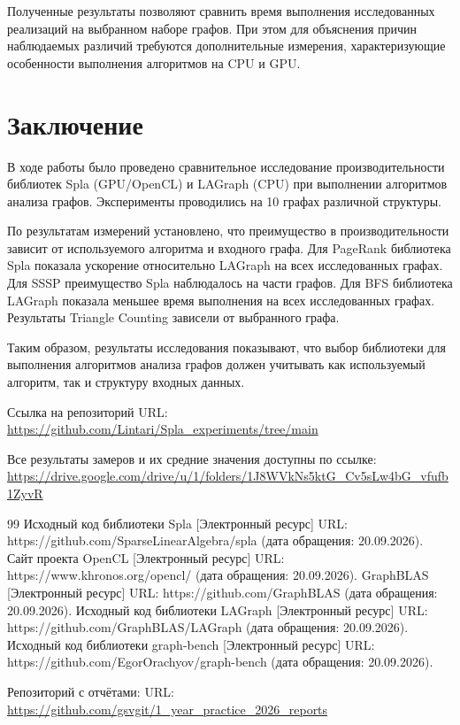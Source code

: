 \documentclass[a4paper]{article}
\begin{document}
Полученные результаты позволяют сравнить время выполнения
исследованных реализаций на выбранном наборе графов.
При этом для объяснения причин наблюдаемых различий
требуются дополнительные измерения, характеризующие
особенности выполнения алгоритмов на CPU и GPU.
\section{Заключение}
В ходе работы было проведено сравнительное исследование
производительности библиотек Spla (GPU/OpenCL) и LAGraph (CPU)
при выполнении алгоритмов анализа графов. Эксперименты
проводились на 10 графах различной структуры.

По результатам измерений установлено, что преимущество
в производительности зависит от используемого алгоритма
и входного графа. Для PageRank библиотека Spla показала
ускорение относительно LAGraph на всех исследованных графах.
Для SSSP преимущество Spla наблюдалось на части графов.
Для BFS библиотека LAGraph показала меньшее время выполнения
на всех исследованных графах. Результаты Triangle Counting
зависели от выбранного графа.

Таким образом, результаты исследования показывают, что
выбор библиотеки для выполнения алгоритмов анализа графов
должен учитывать как используемый алгоритм, так и структуру
входных данных.

Ссылка на репозиторий URL: \url{https://github.com/Lintari/Spla_experiments/tree/main}

Все результаты замеров и их средние значения доступны по ссылке: \url{https://drive.google.com/drive/u/1/folders/1J8WVkNs5ktG_Cv5sLw4bG_vfufb1ZyvR}

\begin{thebibliography}{99}
 Исходный код библиотеки Spla [Электронный ресурс] URL: https://github.com/SparseLinearAlgebra/spla (дата обращения: 20.09.2026).
 Сайт проекта OpenCL [Электронный ресурс] URL: https://www.khronos.org/opencl/ (дата обращения: 20.09.2026).	
 GraphBLAS [Электронный ресурс] URL: https://github.com/GraphBLAS (дата обращения: 20.09.2026).
 Исходный код библиотеки LAGraph [Электронный ресурс] URL: https://github.com/GraphBLAS/LAGraph (дата обращения: 20.09.2026).
 Исходный код библиотеки graph-bench [Электронный ресурс] URL: https://github.com/EgorOrachyov/graph-bench (дата обращения: 20.09.2026).
\end{thebibliography}
Репозиторий с отчётами: URL: \url{https://github.com/gsvgit/1_year_practice_2026_reports}
\end{document}
